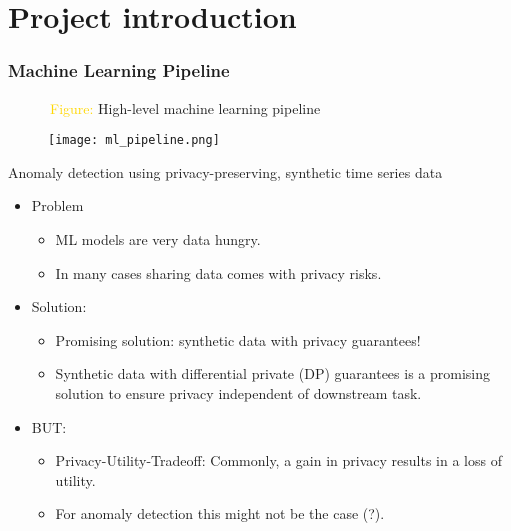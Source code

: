 \section{Project introduction}

\begin{frame}
    \frametitle{Machine Learning Pipeline}
    ~~~~~~\textcolor{gold}{Figure: }High-level machine learning pipeline
    \begin{figure}[h]
        
        \centering
        \texttt{[image: ml\_pipeline.png]}
    \end{figure}
\end{frame}



\begin{frame}{Anomaly detection using privacy-preserving, synthetic time series data}
    
    \begin{itemize}
        \item<1-> Problem
        \begin{itemize}
            \item<1-> ML models are very \alert{data hungry}.
            \item<1-> In many cases sharing data comes with \alert{privacy risks}.
        \end{itemize}
        \item<2-> Solution:
        \begin{itemize}
            \item<2-> Promising solution: \alert{synthetic data} with privacy guarantees!
            \item<2-> Synthetic data with \alert{differential private} (DP) guarantees is a promising solution to ensure privacy independent of downstream task.
        \end{itemize}
        \item<3-> BUT:
        \begin{itemize}
            \item<3-> \alert{Privacy-Utility-Tradeoff}: Commonly, a gain in privacy results in a loss of utility. 
            \item<3-> For \alert{anomaly detection} this might not be the case (?).
        \end{itemize}
    \end{itemize}
\end{frame}


